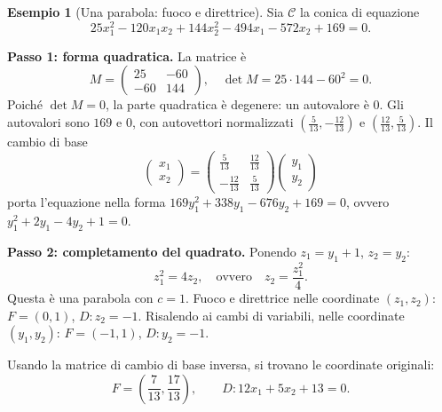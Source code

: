 \documentclass[11pt, a4paper]{book}
\theoremstyle{definition}
\newtheorem{esempio}[definizione]{Esempio}
\theoremstyle{plain}
\theoremstyle{remark}
\begin{document}
\begin{exbox}
\begin{esempio}[Una parabola: fuoco e direttrice]
\label{es:parabola-calc}
Sia $\mathcal{C}$ la conica di equazione
\[
  25x_1^2 - 120x_1x_2 + 144x_2^2 - 494x_1 - 572x_2 + 169 = 0.
\]

\textbf{Passo 1: forma quadratica.} La matrice è
\[
  M = \begin{pmatrix} 25 & -60 \\ -60 & 144 \end{pmatrix}, \quad \det M = 25\cdot144 - 60^2 = 0.
\]
Poiché $\det M = 0$, la parte quadratica è degenere: un autovalore è $0$. Gli autovalori sono $169$ e $0$, con autovettori normalizzati $\left(\frac{5}{13}, -\frac{12}{13}\right)$ e $\left(\frac{12}{13}, \frac{5}{13}\right)$. Il cambio di base
\[
  \begin{pmatrix}x_1\\x_2\end{pmatrix} = \begin{pmatrix}\frac{5}{13} & \frac{12}{13} \\ -\frac{12}{13} & \frac{5}{13}\end{pmatrix}\begin{pmatrix}y_1\\y_2\end{pmatrix}
\]
porta l'equazione nella forma $169y_1^2 + 338y_1 - 676y_2 + 169 = 0$, ovvero $y_1^2 + 2y_1 - 4y_2 + 1 = 0$.

\textbf{Passo 2: completamento del quadrato.} Ponendo $z_1 = y_1 + 1$, $z_2 = y_2$:
\[
  z_1^2 = 4z_2, \quad \text{ovvero} \quad z_2 = \frac{z_1^2}{4}.
\]
Questa è una parabola con $c = 1$. Fuoco e direttrice nelle coordinate $(z_1, z_2)$: $F = (0,1)$, $D\colon z_2 = -1$. Risalendo ai cambi di variabili, nelle coordinate $(y_1, y_2)$: $F = (-1, 1)$, $D\colon y_2 = -1$.

Usando la matrice di cambio di base inversa, si trovano le coordinate originali:
\[
  F = \left(\frac{7}{13}, \frac{17}{13}\right), \qquad D \colon 12x_1 + 5x_2 + 13 = 0.
\]
\end{esempio}
\end{exbox}
\end{document}
